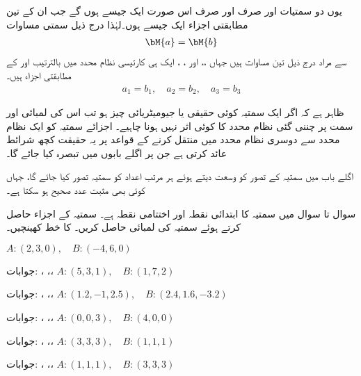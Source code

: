 یوں دو سمتیات  اور  صرف اور صرف اس صورت ایک جیسے ہوں گے جب ان کے تین مطابقتی اجزاء ایک جیسے ہوں۔لہٰذا درج ذیل سمتی مساوات
\begin{align*}
\bM{a}=\bM{b}
\end{align*}
سے مراد درج ذیل تین مساوات ہیں جہاں ،، اور ، ،  ایک ہی کارتیسی نظام محدد میں بالترتیب  اور  کے مطابقتی اجزاء ہیں۔
\begin{align*}
a_1=b_1,\quad a_2=b_2,\quad a_3=b_3
\end{align*}

ظاہر ہے کہ اگر ایک سمتیہ کوئی حقیقی یا جیومیٹریائی چیز ہو تب اس کی لمبائی اور سمت پر چننی گئی نظام محدد کا کوئی اثر نہیں ہونا چاہیے۔ اجزائے سمتیہ کو ایک نظام محدد سے دوسری نظام محدد میں منتقل کرنے کے قواعد پر یہ حقیقت کچھ شرائط عائد کرتی ہے جن پر اگلے بابوں میں تبصرہ کیا جائے گا۔

اگلے باب میں سمتیہ کے تصور کو وسعت دیتے ہوئے ہر مرتب  اعداد کو سمتیہ تصور کیا جائے گا، جہاں   کوئی بھی مثبت عدد صحیح ہو سکتا ہے۔

سوال  تا سوال  میں سمتیہ  کا ابتدائی نقطہ  اور اختتامی نقطہ  ہے۔ سمتیہ  کے اجزاء حاصل کرتے ہوئے سمتیہ کی لمبائی  حاصل کریں۔ کا خط کھینچیں۔

\quad
$A:(2,3,0), \quad B:(-4,6,0)$

جوابات: ،  ،، 
\quad
$A:(5,3,1), \quad B:(1,7,2)$

جوابات: ،  ،، 
\quad
$A:(1.2,-1,2.5), \quad B:(2.4,1.6,-3.2)$

جوابات: ،  ،، 
\quad
$A:(0,0,3), \quad B:(4,0,0)$

جوابات: ،  ،، 
\quad
$A:(3,3,3), \quad B:(1,1,1)$

جوابات: ،  ،، 
\quad
$A:(1,1,1), \quad B:(3,3,3)$

